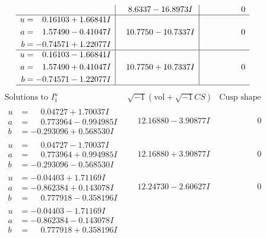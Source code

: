 \documentclass[1p]{elsarticle_modified}
\theoremstyle{definition}
\newcommand{\I}{\sqrt{-1}}
\begin{document}
$$\begin{array}{c|c|c}
 & \phantom{-}8.6337 - 16.8973 I & \phantom{-0.000000 } 0 \\ \hline\begin{aligned}
u &= \phantom{-}0.16103 + 1.66841 I \\
a &= \phantom{-}1.57490 - 0.41047 I \\
b &= -0.74571 + 1.22077 I\end{aligned}
 & \phantom{-}10.7750 - 10.7337 I & \phantom{-0.000000 } 0 \\ \hline\begin{aligned}
u &= \phantom{-}0.16103 - 1.66841 I \\
a &= \phantom{-}1.57490 + 0.41047 I \\
b &= -0.74571 - 1.22077 I\end{aligned}
 & \phantom{-}10.7750 + 10.7337 I & \phantom{-0.000000 } 0\\
 \hline 
 \end{array}$$\newpage$$\begin{array}{c|c|c}  
\text{Solutions to }I^u_{1}& \I (\text{vol} + \sqrt{-1}CS) & \text{Cusp shape}\\
 \hline 
\begin{aligned}
u &= \phantom{-}0.04727 + 1.70037 I \\
a &= \phantom{-}0.773964 - 0.994985 I \\
b &= -0.293096 + 0.568530 I\end{aligned}
 & \phantom{-}12.16880 - 3.90877 I & \phantom{-0.000000 } 0 \\ \hline\begin{aligned}
u &= \phantom{-}0.04727 - 1.70037 I \\
a &= \phantom{-}0.773964 + 0.994985 I \\
b &= -0.293096 - 0.568530 I\end{aligned}
 & \phantom{-}12.16880 + 3.90877 I & \phantom{-0.000000 } 0 \\ \hline\begin{aligned}
u &= -0.04403 + 1.71169 I \\
a &= -0.862384 + 0.143078 I \\
b &= \phantom{-}0.777918 - 0.358196 I\end{aligned}
 & \phantom{-}12.24730 - 2.60627 I & \phantom{-0.000000 } 0 \\ \hline\begin{aligned}
u &= -0.04403 - 1.71169 I \\
a &= -0.862384 - 0.143078 I \\
b &= \phantom{-}0.777918 + 0.358196 I\end{aligned}

\end{array}$$
\end{document}
